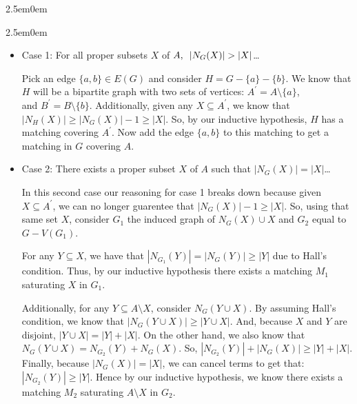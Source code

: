 \documentclass{book}
\newcommand{\hFour}{%
   \color{Cerulean}
   \fontsize{12}{14}\selectfont%
}
\newenvironment{myIndent}{%
   \begin{adjustwidth}{2.5em}{0em}%
}{%
   \end{adjustwidth}%
}
\newcommand{\retTwo}{\hfill\bigbreak}
\begin{document}
{\begin{myIndent}
{\begin{myIndent}
      \begin{itemize}
         \item Case 1: For all proper subsets $X$ of $A, \hspace{0.5em}\lvert N_G(X) \rvert > \lvert X \rvert$\dots\\ {\hFour
            Pick an edge $\{a, b\} \in E(G)$ and consider $H = G - \{a\} - \{b\}$. We know that $H$ will be a bipartite graph with two sets of vertices: $A^\prime = A \setminus \{a\}$,\\ and $B^\prime = B \setminus \{b\}$. Additionally, given any $X \subseteq A^\prime$, we know that\\ $\lvert N_H(X) \rvert \geq \lvert N_G(X) \rvert - 1 \geq \lvert X \rvert$. So, by our inductive hypothesis, $H$ has a matching covering $A^\prime$. Now add the edge $\{a, b\}$ to this matching to get a matching in $G$ covering $A$.
         } 
         \retTwo

         \item Case 2: There exists a proper subset $X$ of $A$ such that $\left|N_G(X)\right| = \left| X \right|$\dots\\ {\hFour
            In this second case our reasoning for case 1 breaks down because given $X \subseteq A^\prime$, we can no longer guarentee that $\lvert N_G(X) \rvert - 1 \geq \lvert X \rvert$. So, using that same set $X$,  consider $G_1$ the induced graph of $N_G(X) \cup X$ and $G_2$ equal to $G - V(G_1)$. \retTwo

            For any $Y \subseteq X$, we have that $\left| N_{G_1}(Y) \right| = \left| N_G(Y) \right| \geq \left| Y \right|$ due to Hall's\\ condition. Thus, by our inductive hypothesis there exists a matching $M_1$\\ saturating $X$ in $G_1$. \retTwo

            Additionally, for any $Y \subseteq A \setminus X$, consider $N_G(Y \cup X)$. By assuming Hall's condition, we know that $\lvert N_G(Y \cup X) \rvert \geq \left| Y \cup X \right|$. And, because $X$ and $Y$ are disjoint, $\left| Y \cup X \right| = \left| Y \right| + \left| X \right|$. On the other hand, we also know that $N_G(Y \cup X) = N_{G_2}(Y) + N_G(X)$. So, $\left|N_{G_2}(Y)\right| + \left| N_G(X) \right| \geq \left| Y \right| + \left| X \right|$. Finally, because $\left|N_G(X)\right| = \left| X \right|$, we can cancel terms to get that:\\ $\left| N_{G_2}(Y) \right| \geq \left| Y \right|$. Hence by our inductive hypothesis, we know there exists a matching $M_2$ saturating $A \setminus X$ in $G_2$. \retTwo

}
\end{itemize}
\end{myIndent}}
\end{myIndent}}
\end{document}
